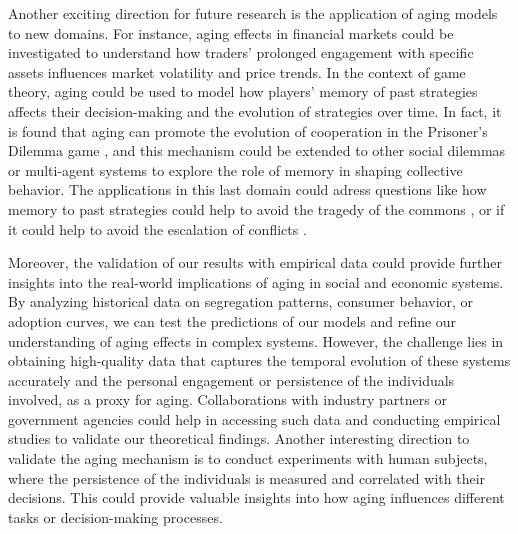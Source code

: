 Another exciting direction for future research is the application of aging models to new domains. For instance, aging effects in financial markets could be investigated to understand how traders' prolonged engagement \cite{} with specific assets influences market volatility and price trends. In the context of game theory, aging could be used to model how players' memory of past strategies affects their decision-making and the evolution of strategies over time. In fact, it is found that aging can promote the evolution of cooperation in the Prisoner's Dilemma game \cite{vieira2023noisy}, and this mechanism could be extended to other social dilemmas or multi-agent systems to explore the role of memory in shaping collective behavior. The applications in this last domain could adress questions like how memory to past strategies could help to avoid the tragedy of the commons \cite{}, or if it could help to avoid the escalation of conflicts \cite{}.

Moreover, the validation of our results with empirical data could provide further insights into the real-world implications of aging in social and economic systems. By analyzing historical data on segregation patterns, consumer behavior, or adoption curves, we can test the predictions of our models and refine our understanding of aging effects in complex systems. However, the challenge lies in obtaining high-quality data that captures the temporal evolution of these systems accurately and the personal engagement or persistence of the individuals involved, as a proxy for aging. Collaborations with industry partners or government agencies could help in accessing such data and conducting empirical studies to validate our theoretical findings. Another interesting direction to validate the aging mechanism is to conduct experiments with human subjects, where the persistence of the individuals is measured and correlated with their decisions. This could provide valuable insights into how aging influences different tasks or decision-making processes.

